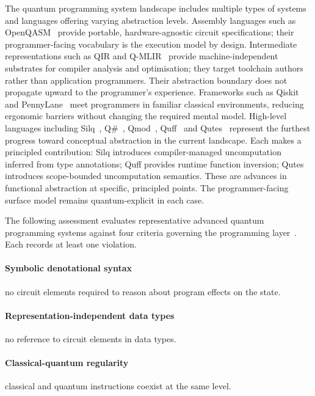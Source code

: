 The quantum programming system landscape includes multiple types of systems and languages offering varying abstraction levels.
Assembly languages such as OpenQASM~\cite{cross2022openqasm3} provide portable, hardware-agnostic circuit specifications; their programmer-facing vocabulary is the execution model by design.
Intermediate representations such as QIR and Q-MLIR~\cite{qiralliance_spec, McCaskey2021MLIRDialectQASM} provide machine-independent substrates for compiler analysis and optimisation; they target toolchain authors rather than application programmers.
Their abstraction boundary does not propagate upward to the programmer's experience.
Frameworks such as Qiskit~\cite{aleksandrowicz2019qiskit} and PennyLane~\cite{bergholm2018pennylane} meet programmers in familiar classical environments, reducing ergonomic barriers without changing the required mental model.
High-level languages including Silq~\cite{bichsel2020silq}, Q\#~\cite{MicrosoftQSharpOverview}, Qmod~\cite{vax2025qmodexpressivehighlevelquantum}, Quff~\cite{wright2024quff} and Qutes~\cite{faro2025qutes} represent the furthest progress toward conceptual abstraction in the current landscape.
Each makes a principled contribution: Silq introduces compiler-managed uncomputation inferred from type annotations; Quff provides runtime function inversion; Qutes introduces scope-bounded uncomputation semantics.
These are advances in functional abstraction at specific, principled points.
The programmer-facing surface model remains quantum-explicit in each case.

The following assessment evaluates representative advanced quantum programming systems against four criteria governing the programming layer~\cite{nunez_corrales2025betterabstractmachines}.
Each records at least one violation.

\paragraph{Symbolic denotational syntax} no circuit elements required to reason about program effects on the state.
\paragraph{Representation-independent data types} no reference to circuit elements in data types.
\paragraph{Classical-quantum regularity} classical and quantum instructions coexist at the same level.
